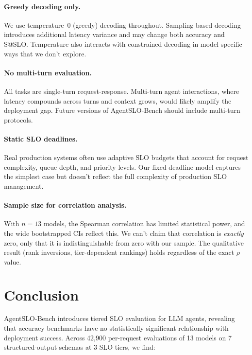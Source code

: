 \documentclass[11pt]{article}
\begin{document}
\paragraph{Greedy decoding only.}
We use temperature~0 (greedy) decoding throughout.  Sampling-based decoding introduces additional latency variance and may change both accuracy and S@SLO.  Temperature also interacts with constrained decoding in model-specific ways that we don't explore.

\paragraph{No multi-turn evaluation.}
All tasks are single-turn request-response.  Multi-turn agent interactions, where latency compounds across turns and context grows, would likely amplify the deployment gap.  Future versions of AgentSLO-Bench should include multi-turn protocols.

\paragraph{Static SLO deadlines.}
Real production systems often use adaptive SLO budgets that account for request complexity, queue depth, and priority levels.  Our fixed-deadline model captures the simplest case but doesn't reflect the full complexity of production SLO management.

\paragraph{Sample size for correlation analysis.}
With $n = 13$ models, the Spearman correlation has limited statistical power, and the wide bootstrapped CIs reflect this.  We can't claim that correlation is \emph{exactly} zero, only that it is indistinguishable from zero with our sample.  The qualitative result (rank inversions, tier-dependent rankings) holds regardless of the exact $\rho$ value.

\section{Conclusion}

AgentSLO-Bench introduces tiered SLO evaluation for LLM agents, revealing that accuracy benchmarks have no statistically significant relationship with deployment success.  Across 42{,}900 per-request evaluations of 13 models on 7 structured-output schemas at 3 SLO tiers, we find:
\end{document}
